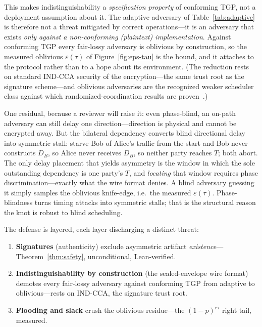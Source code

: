 This makes indistinguishability a \emph{specification property} of conforming TGP, not a deployment assumption about it. The adaptive adversary of Table~\ref{tab:adaptive} is therefore not a threat mitigated by correct operations---it is an adversary that exists \emph{only against a non-conforming (plaintext) implementation}. Against conforming TGP every fair-lossy adversary is oblivious by construction, so the measured oblivious $\varepsilon(\tau)$ of Figure~\ref{fig:eps-tau} is the bound, and it attaches to the protocol rather than to a hope about its environment. (The reduction rests on standard IND-CCA security of the encryption---the same trust root as the signature scheme---and oblivious adversaries are the recognized weaker scheduler class against which randomized-coordination results are proven~\cite{benor1983another}.)

One residual, because a reviewer will raise it: even phase-blind, an on-path adversary can still delay one direction---direction is physical and cannot be encrypted away. But the bilateral dependency converts blind directional delay into symmetric stall: starve Bob of Alice's traffic from the start and Bob never constructs $D_B$, so Alice never receives $D_B$, so neither party reaches $T$; both abort. The only delay placement that yields asymmetry is the window in which the sole outstanding dependency is one party's $T$, and \emph{locating} that window requires phase discrimination---exactly what the wire format denies. A blind adversary guessing it simply samples the oblivious knife-edge, i.e.\ the measured $\varepsilon(\tau)$. Phase-blindness turns timing attacks into symmetric stalls; that is the structural reason the knot is robust to blind scheduling.

The defense is layered, each layer discharging a distinct threat:
\begin{enumerate}
    \item \textbf{Signatures} (authenticity) exclude asymmetric artifact \emph{existence}---Theorem~\ref{thm:safety}, unconditional, Lean-verified.
    \item \textbf{Indistinguishability by construction} (the sealed-envelope wire format) demotes every fair-lossy adversary against conforming TGP from adaptive to oblivious---rests on IND-CCA, the signature trust root.
    \item \textbf{Flooding and slack} crush the oblivious residue---the $(1-p)^{r\tau}$ right tail, measured.
\end{enumerate}

